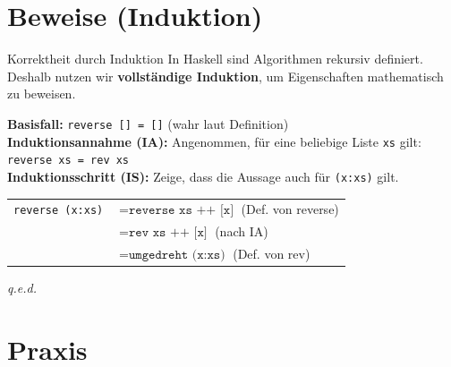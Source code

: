 \documentclass[aspectratio=169,11pt]{beamer}
\begin{document}
\section{Beweise (Induktion)}

\begin{frame}[fragile]{Korrektheit durch Induktion}
    In Haskell sind Algorithmen rekursiv definiert. Deshalb nutzen wir \textbf{vollständige Induktion}, um Eigenschaften mathematisch zu beweisen.
    
    \begin{tcolorbox}[modernbox, title=Beispiel: Beweis von \texttt{reverse (x:xs)}]
        \textbf{Basisfall:} \texttt{reverse [] = []} \quad (wahr laut Definition) \\
        \vspace{0.2cm}
        \textbf{Induktionsannahme (IA):} Angenommen, für eine beliebige Liste \texttt{xs} gilt: \\
        \texttt{reverse xs = rev xs} \\
        \vspace{0.2cm}
        \textbf{Induktionsschritt (IS):} Zeige, dass die Aussage auch für \texttt{(x:xs)} gilt. \\
        \begin{tabular}{ll}
            \texttt{reverse (x:xs)} & $= \texttt{reverse xs ++ [x]}$ \quad (Def. von reverse) \\
            & $= \texttt{rev xs ++ [x]}$ \quad (nach IA) \\
            & $= \texttt{umgedreht (x:xs)}$ \quad (Def. von rev) \\
        \end{tabular}
        \flushright \textit{q.e.d.}
    \end{tcolorbox}
\end{frame}

\section{Praxis}
\end{document}
